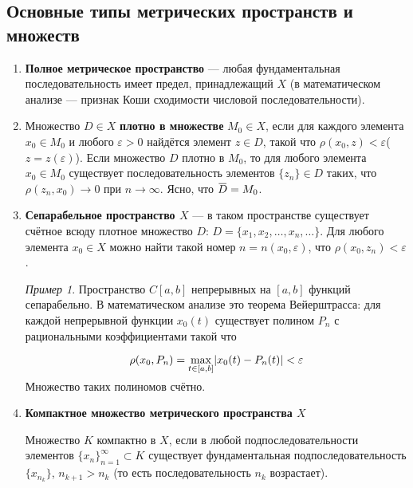 \documentclass[12pt,a4paper,titlepage,oneside]{book}
\newcommand{\overbar}[1]{\mkern 1.5mu\overline{\mkern-1.5mu#1\mkern-1.5mu}\mkern 1.5mu}
\theoremstyle{definition}
\theoremstyle{plain}
\theoremstyle{break}
\theoremstyle{remark}
\theoremstyle{remark}
\newtheorem*{example}{Пример}
\theoremstyle{remark}
\theoremstyle{remark}
\theoremstyle{plain}
\theoremstyle{plain}
\begin{document}
\subsection*{Основные типы метрических пространств и множеств}

\begin{enumerate}

	\item \textbf{Полное метрическое пространство} --- любая фундаментальная последовательность имеет предел, принадлежащий $X$ (в математическом анализе --- признак Коши сходимости числовой последовательности).

	\item Множество $D \in X$ \textbf{плотно в множестве} $ M_0 \in X$, если для каждого элемента $x_0 \in M_0$ и любого $\varepsilon > 0$ найдётся элемент $z \in D$, такой что $\rho(x_0, z) < \varepsilon$($z = z(\varepsilon)$). Если множество $D$ плотно в $M_0$, то для любого элемента $x_0 \in  M_0$ существует последовательность элементов $\lbrace z_n \rbrace \in D$ таких, что $\rho(z_n, x_0) \to 0$ при $n \to \infty$. Ясно, что $\overbar{D} = M_0$.

	\item \textbf{Сепарабельное пространство $X$} --- в таком пространстве существует счётное всюду плотное множество $D$: $D=\lbrace x_1,x_2,\ldots,x_n,\ldots \rbrace$. Для любого элемента $x_0 \in X$ можно найти такой номер $n = n(x_0,\varepsilon)$, что $\rho(x_0, z_n) < \varepsilon$.

	\begin{example}	
	Пространство $C[a,b]$ непрерывных на $[a,b]$ функций сепарабельно. В математическом анализе это теорема Вейерштрасса: для каждой непрерывной функции $x_0(t)$ существует полином $P_n$ с рациональными коэффициентами такой что
	
	\begin{equation*}
	\rho(x_0, P_n)=\smash{\displaystyle\max_{t \in [a,b]}} |x_0(t)-P_n(t)| < \varepsilon
	\end{equation*}

	Множество таких полиномов счётно.
	\end{example}

	\item \textbf{Компактное множество метрического пространства $X$}

	Множество $K$ компактно в $X$, если в любой подпоследовательности элементов $\lbrace x_n \rbrace_{n=1}^{\infty} \subset K$ существует фундаментальная подпоследовательность $\lbrace x_{n_k} \rbrace$, $n_{k+1}>n_k$ (то есть последовательность $n_k$ возрастает).

\end{enumerate}
\end{document}
